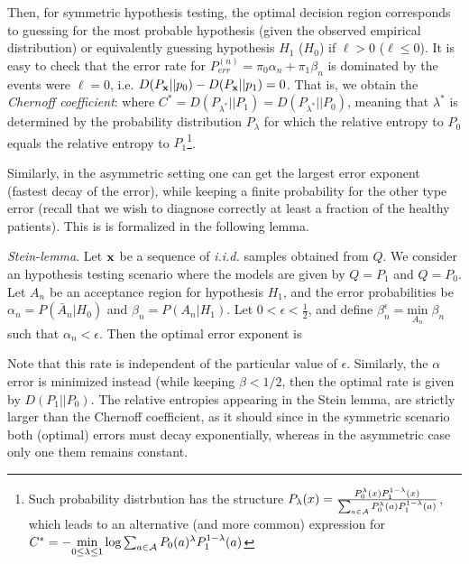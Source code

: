 Then, for symmetric hypothesis testing, the optimal decision region corresponds to guessing for the most probable hypothesis (given the observed empirical distribution) or equivalently guessing hypothesis
$H_{1}$ ($H_{0}$) if $\ell>0$ ($\ell\leq 0$). It is easy to check that the error rate for $P_{err}^{(n)} = \pi_0 \alpha_n + \pi_1 \beta_n$ is dominated by the events were $\ell=0$, i.e. $D(P_{\mathbf{x}}||p_0) - D(P_{\mathbf{x}}||p_1) =0$.
That is, we obtain the \textit{Chernoff coefficient}:
where $C^* = D(P_{\lambda^*}||P_1) = D(P_{\lambda^*}||P_0)$, meaning that $\lambda^*$ is determined by the probability distribution $P_\lambda$ for which the relative entropy to $P_0$ equals the relative entropy to $P_1$\footnote{Such probability distrbution has the structure $P_\lambda(x) = \frac{P_0^{\lambda}(x) P_1^{1-\lambda}(x)}{\sum_{a\in\mathcal{A}} P_0^\lambda(a)P_1^{1-\lambda}(a)}$, which leads to an alternative (and more common) expression for $C^* = -\underset{0\leq\lambda\leq 1}{\text{ min }} \log{\sum_{a\in\mathcal{A}} P_0(a)^\lambda P_1^{1-\lambda}(a)}$
}.

Similarly, in the asymmetric setting one can get the largest error exponent (fastest decay of the error), while keeping a finite probability for the other type error (recall that we wish to diagnose correctly at least a fraction of the healthy patients). This is is formalized in the following lemma.

\textit{Stein-lemma}. Let $\mathbf{x}$ be a sequence of \textit{i.i.d.} samples obtained from $Q$. We consider an hypothesis testing scenario where the models are given by $Q=P_1$ and $Q=P_0$. Let $A_n$ be an acceptance region for hypothesis $H_1$, and the error probabilities be $\alpha_n = P(\bar{A}_n|H_0)$ and $\beta_n = P(A_n|H_1)$. Let $0<\epsilon<\frac{1}{2}$, and define $\beta_n^\epsilon = \underset{A_n}{\text{min}}\;\beta_n$ such that $\alpha_n<\epsilon$.
Then the optimal error exponent is

Note that this rate is independent of the particular value of $\epsilon$. Similarly, the $\alpha$ error is minimized instead (while keeping $\beta<1/2$, then the optimal rate is given by $D(P_1||P_0)$.
The relative entropies appearing in the Stein lemma, are strictly larger than the Chernoff coefficient, as it should since in the symmetric scenario both (optimal) errors must decay exponentially, whereas in the asymmetric case only one them remains constant.


